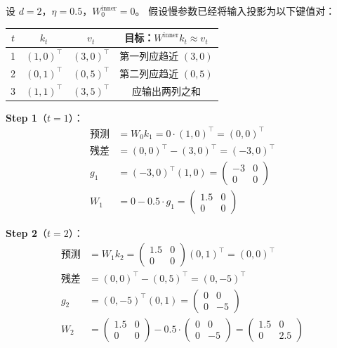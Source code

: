 \begin{example}
设 $d = 2$，$\eta = 0.5$，$W_0^{\text{inner}} = 0$。
假设慢参数已经将输入投影为以下键值对：

\medskip
\begin{center}
\begin{tabular}{cccc}
\toprule
$t$ & $k_t$ & $v_t$ & 目标：$W^{\text{inner}} k_t \approx v_t$ \\
\midrule
1 & $(1, 0)^\top$ & $(3, 0)^\top$ & 第一列应趋近 $(3, 0)$ \\
2 & $(0, 1)^\top$ & $(0, 5)^\top$ & 第二列应趋近 $(0, 5)$ \\
3 & $(1, 1)^\top$ & $(3, 5)^\top$ & 应输出两列之和 \\
\bottomrule
\end{tabular}
\end{center}

\textbf{Step 1}（$t=1$）：
\begin{align}
  \text{预测} &= W_0 k_1 = 0 \cdot (1,0)^\top = (0, 0)^\top \\
  \text{残差} &= (0,0)^\top - (3,0)^\top = (-3, 0)^\top \\
  g_1 &= (-3, 0)^\top (1, 0) = \begin{pmatrix} -3 & 0 \\ 0 & 0 \end{pmatrix} \\
  W_1 &= 0 - 0.5 \cdot g_1 = \begin{pmatrix} 1.5 & 0 \\ 0 & 0 \end{pmatrix}
\end{align}

\textbf{Step 2}（$t=2$）：
\begin{align}
  \text{预测} &= W_1 k_2 = \begin{pmatrix} 1.5 & 0 \\ 0 & 0 \end{pmatrix}
  (0,1)^\top = (0, 0)^\top \\
  \text{残差} &= (0,0)^\top - (0,5)^\top = (0, -5)^\top \\
  g_2 &= (0, -5)^\top (0, 1) = \begin{pmatrix} 0 & 0 \\ 0 & -5 \end{pmatrix} \\
  W_2 &= \begin{pmatrix} 1.5 & 0 \\ 0 & 0 \end{pmatrix}
  - 0.5 \cdot \begin{pmatrix} 0 & 0 \\ 0 & -5 \end{pmatrix}
  = \begin{pmatrix} 1.5 & 0 \\ 0 & 2.5 \end{pmatrix}
\end{align}


\end{example}
